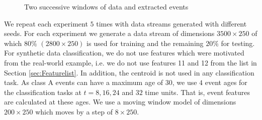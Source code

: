 \documentclass[a4paper,11pt]{article}
\begin{document}
\begin{figure}[H]
	\centering
	\caption{\footnotesize Two successive windows of data and extracted events }
	\label{fig:TwoWindows}
\end{figure}

We repeat each experiment $5$ times with data streams generated with different seeds. For each experiment we generate a data stream of dimensions $3500 \times 250 $ of which $80\%$ $(2800 \times 250 )$ is used for training and the remaining $20\%$ for testing. For synthetic data classification, we do not use features which were motivated from the real-world example, i.e. we do not use features 11 and 12 from the list in Section \ref{sec:Featurelist}. In addition, the centroid is not used in any classification task. As class A events can have a maximum age of $30$, we use $4$ event ages for the classification tasks at $t = 8, 16, 24$ and $32$ time units. That is, event features are calculated at these ages. We use a moving window model of dimensions $200 \times 250 $ which moves by a step of $ 8 \times 250$.
\end{document}
